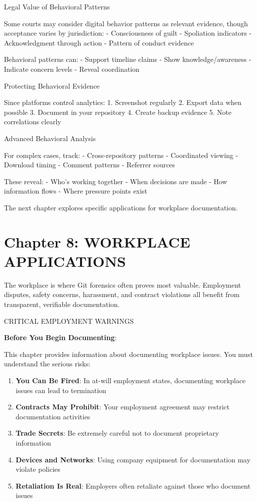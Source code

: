 Legal Value of Behavioral Patterns

Some courts may consider digital behavior patterns as relevant evidence,
though acceptance varies by jurisdiction: - Consciousness of guilt -
Spoliation indicators - Acknowledgment through action - Pattern of
conduct evidence

Behavioral patterns can: - Support timeline claims - Show
knowledge/awareness - Indicate concern levels - Reveal coordination

Protecting Behavioral Evidence

Since platforms control analytics: 1. Screenshot regularly 2. Export
data when possible 3. Document in your repository 4. Create backup
evidence 5. Note correlations clearly

Advanced Behavioral Analysis

For complex cases, track: - Cross-repository patterns - Coordinated
viewing - Download timing - Comment patterns - Referrer sources

These reveal: - Who's working together - When decisions are made - How
information flows - Where pressure points exist

The next chapter explores specific applications for workplace
documentation.

\section{Chapter 8: WORKPLACE
APPLICATIONS}\label{chapter-8-workplace-applications}

The workplace is where Git forensics often proves most valuable.
Employment disputes, safety concerns, harassment, and contract
violations all benefit from transparent, verifiable documentation.

CRITICAL EMPLOYMENT WARNINGS

\textbf{Before You Begin Documenting}:

This chapter provides information about documenting workplace issues.
You must understand the serious risks:

\begin{enumerate}
\def\labelenumi{\arabic{enumi}.}
\tightlist
\item
  \textbf{You Can Be Fired}: In at-will employment states, documenting
  workplace issues can lead to termination
\item
  \textbf{Contracts May Prohibit}: Your employment agreement may
  restrict documentation activities
\item
  \textbf{Trade Secrets}: Be extremely careful not to document
  proprietary information
\item
  \textbf{Devices and Networks}: Using company equipment for
  documentation may violate policies
\item
  \textbf{Retaliation Is Real}: Employers often retaliate against those
  who document issues
\end{enumerate}

